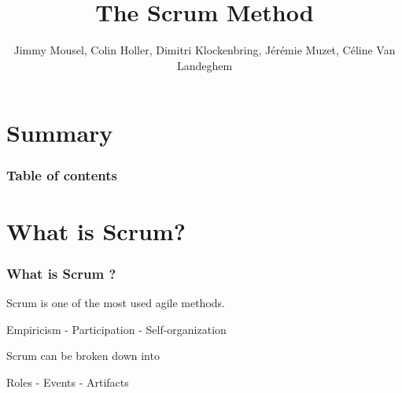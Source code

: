 \documentclass{beamer}
\title{The Scrum Method}
\author{Jimmy Mousel, Colin Holler, Dimitri Klockenbring, Jérémie Muzet, Céline Van Landeghem}
\date{}
\begin{document}
\frame{\titlepage}



\section{Summary}

\begin{frame}
    \frametitle{Table of contents}
    \tableofcontents
\end{frame}



\section{What is Scrum?}

\begin{frame}
    \frametitle{What is Scrum ?}
    \begin{block}
         Scrum is one of the most used agile methods.
        \begin{center}
             Empiricism  - Participation  - Self-organization
        \end{center}
    \end{block}
    \pause
    \begin{block}
         Scrum can be broken down into
        \begin{center}
             Roles  - Events  - Artifacts
        \end{center}
    \end{block}
\end{frame}
\end{document}

